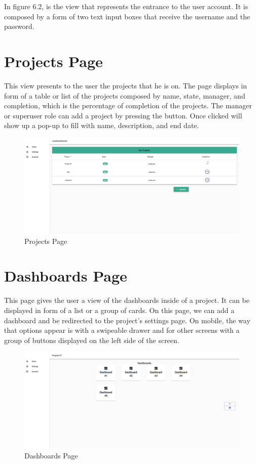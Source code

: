 \documentclass[a4paper,twoside,10pt]{report}
\begin{document}
\newpage 

In figure 6.2, is the view that represents the entrance to the user account. It is composed by a form of two text input boxes that receive the username and the password.

\section{Projects Page}
This view presents to the user the projects that he is on. The page displays in form of a table or list of the projects composed by name, state, manager, and completion, which is the percentage of completion of the projects. The manager or superuser role can add a project by pressing the button. Once clicked will show up a pop-up to fill with name, description, and end date.

\begin{figure}[h!]
\center
  \includegraphics[width=\textwidth]{projectsPage.png}
\caption{Projects Page}
\end{figure}

\section{Dashboards Page}
This page gives the user a view of the dashboards inside of a project. It can be displayed in form of a list or a group of cards. On this page, we can add a dashboard and be redirected to the project's settings page. On mobile, the way that options appear is with a swipeable drawer and for other screens with a group of buttons displayed on the left side of the screen.

\begin{figure}[h!]
\center
  \includegraphics[width=\textwidth]{dashboardsPage.png}
\caption{Dashboards Page}
\end{figure}
\end{document}
